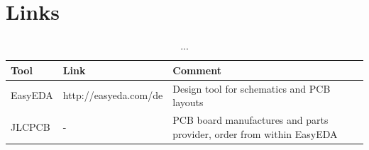 \FloatBarrier

\section{Links}

\begin{table}[!ht]
    \begin{center}
        \caption{...}
        \begin{tabular}{|l|l|p{}|}
            \toprule
            \textbf{Tool} & \textbf{Link} & \textbf{Comment} \\
            \midrule
            EasyEDA & http://easyeda.com/de & Design tool for schematics and PCB layouts \\
            \midrule
            JLCPCB & - & PCB board manufactures and parts provider, order from within EasyEDA \\
            \bottomrule
        \end{tabular}
    \end{center}
\end{table}
